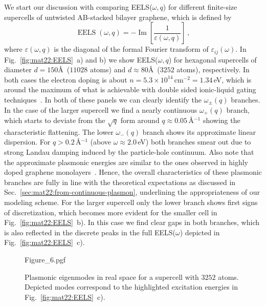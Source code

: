 We start our discussion with comparing EELS($\omega,q$) for different finite-size supercells of untwisted AB-stacked bilayer graphene, which is defined by
\begin{equation*}
    \operatorname{EELS}(\omega, q) = -\operatorname{Im}\left[ \frac{1}{\varepsilon(\omega, q)} \right] \,,
\end{equation*}
where $\varepsilon(\omega, q)$ is the diagonal of the formal Fourier transform of $\varepsilon_{ij}(\omega)$. In Fig.~\ref{fig:mat22:EELS}~a) and b) we show EELS($\omega,q$) for hexagonal supercells of diameter $d=150$\AA\ ($11028$ atoms) and $d\approx80$\AA\ ($3252$ atoms), respectively. In both cases the electron doping is about $n = 5.3\times10^{14}\,$cm$^{-2} = 1.34\,$eV, which is around the maximum of what is achievable with double sided ionic-liquid gating techniques~\cite{zheliuk_josephson_2019}. In both of these panels we can clearly identify the $\omega_\pm(q)$ branches. In the case of the larger supercell we find a nearly continuous $\omega_+(q)$ branch, which starts to deviate from the $\sqrt{q}$ form around $q\approx 0.05\,$\AA$^{-1}$ showing the characteristic flattening. The lower $\omega_-(q)$ branch shows its approximate linear dispersion. For $q >0.2\,$\AA$^{-1}$ (above $\omega \approx 2.0\,$eV) both branches smear out due to strong Landau damping induced by the particle-hole continuum. Also note that the approximate plasmonic energies are similar to the ones observed in highly doped graphene monolayers~\cite{shin_control_2011}. Hence, the overall characteristics of these plasmonic branches are fully in line with the theoretical expectations as discussed in Sec.~\ref{sec:mat22:from-continuous-plasmon}, underlining the appropriateness of our modeling scheme. For the larger supercell only the lower branch shows first signs of discretization, which becomes more evident for the smaller cell in Fig.~\ref{fig:mat22:EELS}~b). In this case we find clear gaps in both branches, which is also reflected in the discrete peaks in the full EELS($\omega$) depicted in Fig.~\ref{fig:mat22:EELS}~c).

\begin{figure}
    \centering
    {Figure_6.pgf}
    \caption{Plasmonic eigenmodes in real space for a supercell with $3252$ atoms. Depicted modes correspond to the highlighted excitation energies in Fig.~\ref{fig:mat22:EELS}~c).}
    \label{fig:mat22:modes}
\end{figure}

